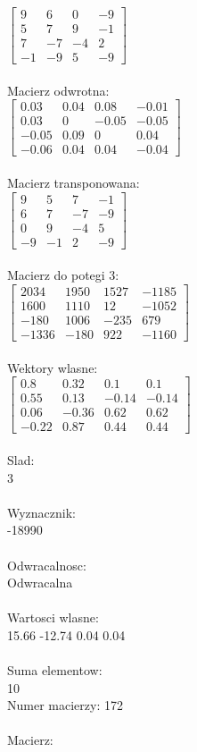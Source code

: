 \documentclass[a4paper,12pt]{article}
\begin{document}
$\begin{bmatrix} 9&6&0&-9\\5&7&9&-1\\7&-7&-4&2\\-1&-9&5&-9 \end{bmatrix}$
\\
\\
Macierz odwrotna:\\

$\begin{bmatrix} 0.03&0.04&0.08&-0.01\\0.03&0&-0.05&-0.05\\-0.05&0.09&0&0.04\\-0.06&0.04&0.04&-0.04 \end{bmatrix}$
\\
\\
Macierz transponowana:\\

$\begin{bmatrix} 9&5&7&-1\\6&7&-7&-9\\0&9&-4&5\\-9&-1&2&-9 \end{bmatrix}$
\\
\\
Macierz do potegi 3:\\

$\begin{bmatrix} 2034&1950&1527&-1185\\1600&1110&12&-1052\\-180&1006&-235&679\\-1336&-180&922&-1160 \end{bmatrix}$
\\
\\
Wektory wlasne:\\

$\begin{bmatrix} 0.8&0.32&0.1&0.1\\0.55&0.13&-0.14&-0.14\\0.06&-0.36&0.62&0.62\\-0.22&0.87&0.44&0.44 \end{bmatrix}$
\\
\\
Slad:\\
3
\\
\\
Wyznacznik:\\
-18990
\\
\\
Odwracalnosc:\\
Odwracalna
\\
\\
Wartosci wlasne:\\
15.66 -12.74 0.04 0.04
\\
\\
Suma elementow:\\
10
\\
\newpage
Numer macierzy:
172
\\
\\
Macierz:\\
\end{document}
